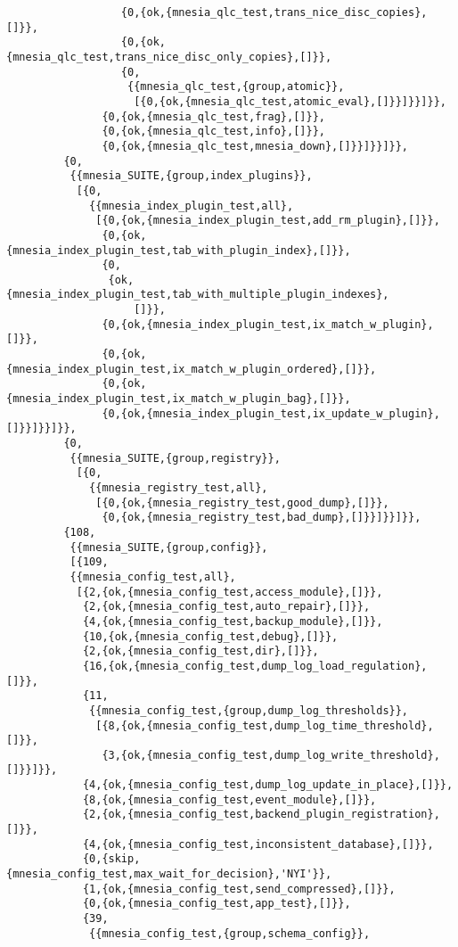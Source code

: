 \begin{verbatim}
                  {0,{ok,{mnesia_qlc_test,trans_nice_disc_copies},[]}},
                  {0,{ok,{mnesia_qlc_test,trans_nice_disc_only_copies},[]}},
                  {0,
                   {{mnesia_qlc_test,{group,atomic}},
                    [{0,{ok,{mnesia_qlc_test,atomic_eval},[]}}]}}]}},
               {0,{ok,{mnesia_qlc_test,frag},[]}},
               {0,{ok,{mnesia_qlc_test,info},[]}},
               {0,{ok,{mnesia_qlc_test,mnesia_down},[]}}]}}]}},
         {0,
          {{mnesia_SUITE,{group,index_plugins}},
           [{0,
             {{mnesia_index_plugin_test,all},
              [{0,{ok,{mnesia_index_plugin_test,add_rm_plugin},[]}},
               {0,{ok,{mnesia_index_plugin_test,tab_with_plugin_index},[]}},
               {0,
                {ok,{mnesia_index_plugin_test,tab_with_multiple_plugin_indexes},
                    []}},
               {0,{ok,{mnesia_index_plugin_test,ix_match_w_plugin},[]}},
               {0,{ok,{mnesia_index_plugin_test,ix_match_w_plugin_ordered},[]}},
               {0,{ok,{mnesia_index_plugin_test,ix_match_w_plugin_bag},[]}},
               {0,{ok,{mnesia_index_plugin_test,ix_update_w_plugin},[]}}]}}]}},
         {0,
          {{mnesia_SUITE,{group,registry}},
           [{0,
             {{mnesia_registry_test,all},
              [{0,{ok,{mnesia_registry_test,good_dump},[]}},
               {0,{ok,{mnesia_registry_test,bad_dump},[]}}]}}]}},
         {108,
          {{mnesia_SUITE,{group,config}},
          [{109,
          {{mnesia_config_test,all},
           [{2,{ok,{mnesia_config_test,access_module},[]}},
            {2,{ok,{mnesia_config_test,auto_repair},[]}},
            {4,{ok,{mnesia_config_test,backup_module},[]}},
            {10,{ok,{mnesia_config_test,debug},[]}},
            {2,{ok,{mnesia_config_test,dir},[]}},
            {16,{ok,{mnesia_config_test,dump_log_load_regulation},[]}},
            {11,
             {{mnesia_config_test,{group,dump_log_thresholds}},
              [{8,{ok,{mnesia_config_test,dump_log_time_threshold},[]}},
               {3,{ok,{mnesia_config_test,dump_log_write_threshold},[]}}]}},
            {4,{ok,{mnesia_config_test,dump_log_update_in_place},[]}},
            {8,{ok,{mnesia_config_test,event_module},[]}},
            {2,{ok,{mnesia_config_test,backend_plugin_registration},[]}},
            {4,{ok,{mnesia_config_test,inconsistent_database},[]}},
            {0,{skip,{mnesia_config_test,max_wait_for_decision},'NYI'}},
            {1,{ok,{mnesia_config_test,send_compressed},[]}},
            {0,{ok,{mnesia_config_test,app_test},[]}},
            {39,
             {{mnesia_config_test,{group,schema_config}},

\end{verbatim}
